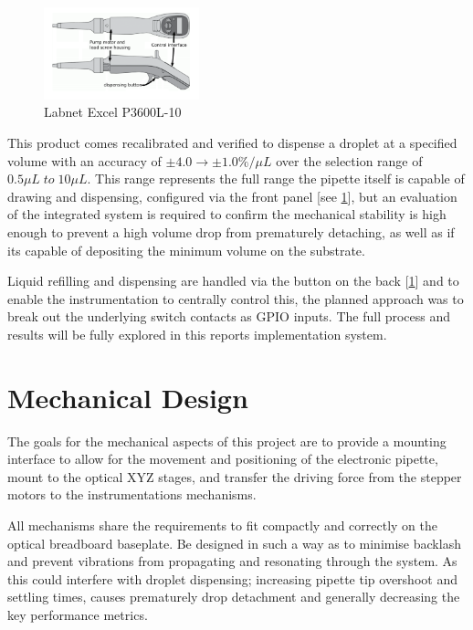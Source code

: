 \begin{figure}[h]
    \centering
    \includegraphics[width=0.4\textwidth]{img/epip.png}
    \caption{Labnet Excel P3600L-10}
    \label{fig:pip_dia}
\end{figure}

This product comes recalibrated and verified to dispense a droplet at a specified volume with an accuracy of $\pm 4.0\rightarrow \pm 1.0 \%/\mu L$ over the selection range of $0.5\mu L \; to \; 10\mu L$. This range represents the full range the pipette itself is capable of drawing and dispensing, configured via the front panel [see \ref{fig:pip_dia}], but an evaluation of the integrated system is required to confirm the mechanical stability is high enough to prevent a high volume drop from prematurely detaching, as well as if its capable of depositing the minimum volume on the substrate.


Liquid refilling and dispensing are handled via the button on the back [\ref{fig:pip_dia}] and to enable the instrumentation to centrally control this, the planned approach was to break out the underlying switch contacts as GPIO inputs. The full process and results will be fully explored in this reports implementation system.


\section{Mechanical Design}

The goals for the mechanical aspects of this project are to provide a mounting interface to allow for the movement and positioning of the electronic pipette, mount to the optical XYZ stages, and transfer the driving force from the stepper motors to the instrumentations mechanisms.

All mechanisms share the requirements to fit compactly and correctly on the optical breadboard baseplate. Be designed in such a way as to minimise backlash and prevent vibrations from propagating and resonating through the system. As this could interfere with droplet dispensing; increasing pipette tip overshoot and settling times, causes prematurely drop detachment and generally decreasing the key performance metrics.

